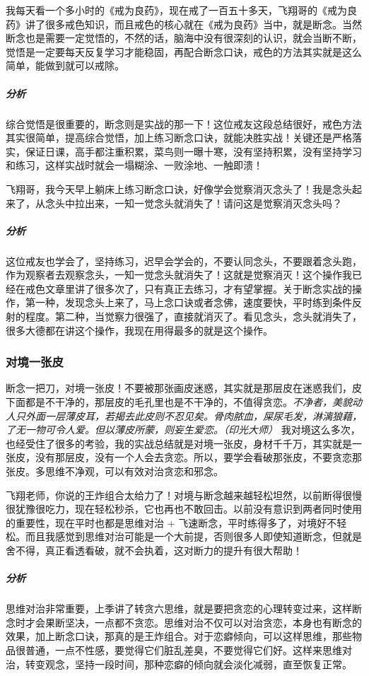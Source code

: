 \begin{case}
    我每天看一个多小时的《戒为良药》，现在戒了一百五十多天，飞翔哥的《戒为良药》讲了很多戒色知识，而且戒色的核心就在《戒为良药》当中，就是断念。当然断念也是需要一定觉悟的，不然的话，脑海中没有很深刻的认识，就会当断不断，觉悟是一定要每天反复学习才能稳固，再配合断念口诀，戒色的方法其实就是这么简单，能做到就可以戒除。
    \subparagraph{分析} 综合觉悟是很重要的，断念则是实战的那一下！这位戒友这段总结很好，戒色方法其实很简单，提高综合觉悟，加上练习断念口诀，就能决胜实战！关键还是严格落实，保证日课，高手都注重积累，菜鸟则一曝十寒，没有坚持积累，没有坚持学习和练习，这样实战时就会一塌糊涂、一败涂地、一触即溃！
\end{case}

\begin{case}
    飞翔哥，我今天早上躺床上练习断念口诀，好像学会觉察消灭念头了！我是念头起来了，从念头中拉出来，一知一觉念头就消失了！请问这是觉察消灭念头吗？
    \subparagraph{分析} 这位戒友也学会了，坚持练习，迟早会学会的，不要认同念头，不要跟着念头跑，作为观察者去观察念头，一知一觉念头就消失了！这就是觉察消灭！这个操作我已经在戒色文章里讲了很多次了，只有真正去练习，才有望掌握。关于断念实战的操作，第一种，发现念头上来了，马上念口诀或者念佛，速度要快，平时练到条件反射的程度。第二种，当觉察力很强了，直接就消灭了。看见念头，念头就消失了，很多大德都在讲这个操作，我现在用得最多的就是这个操作。
\end{case}

\subsubsection{对境一张皮}

断念一把刀，对境一张皮！不要被那张画皮迷惑，其实就是那层皮在迷惑我们，皮下面都是不干净的，那层皮的毛孔里也是不干净的，不值得贪恋。\textit{不净者，美貌动人只外面一层薄皮耳，若揭去此皮则不忍见矣。骨肉脓血，屎尿毛发，淋漓狼藉，了无一物可令人爱。但以薄皮所蒙，则妄生爱恋。（印光大师）} 我对境这么多次，也经受住了很多的考验，我的实战总结就是对境一张皮，身材千千万，其实就是一张皮，没有那层皮，没有一个人会去贪恋。所以，要学会看破那张皮，不要贪恋那张皮。多思维不净观，可以有效对治贪恋和邪念。

\begin{case}
    飞翔老师，你说的王炸组合太给力了！对境与断念越来越轻松坦然，以前断得很慢很犹豫很吃力，现在轻松秒杀，它也再也不敢回击。以前没有意识到两者同时使用的重要性，现在平时也都是思维对治 + 飞速断念，平时练得多了，对境好不轻松。而且我感觉到思维对治可能是一个大前提，否则很多人即使知道断念，但就是舍不得，真正看透看破，就不会执着，这对断力的提升有很大帮助！
    \subparagraph{分析} 思维对治非常重要，上季讲了转贪六思维，就是要把贪恋的心理转变过来，这样断念时才会果断坚决，一点都不贪恋。思维对治不仅可以对治贪恋，本身也有断念的效果，加上断念口诀，那真的是王炸组合。对于恋癖倾向，可以这样思维，那些物品很普通，一点不性感，要觉得它们脏乱差臭，不要觉得它们好。这样来思维对治，转变观念，坚持一段时间，那种恋癖的倾向就会淡化减弱，直至恢复正常。
\end{case}

